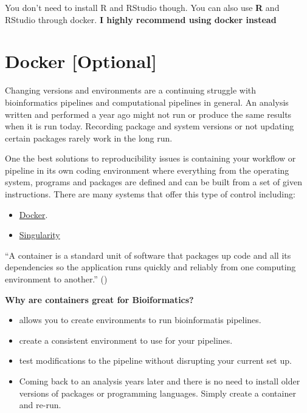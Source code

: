 \documentclass[
]{book}
\providecommand{\tightlist}{%
  \setlength{\itemsep}{0pt}\setlength{\parskip}{0pt}}
\begin{document}
You don't need to install R and RStudio though. You can also use \textbf{R} and RStudio through docker. \textbf{I highly recommend using docker instead}

\section{Docker {[}Optional{]}}\label{docker-optional}

Changing versions and environments are a continuing struggle with bioinformatics pipelines and computational pipelines in general. An analysis written and performed a year ago might not run or produce the same results when it is run today. Recording package and system versions or not updating certain packages rarely work in the long run.

One the best solutions to reproducibility issues is containing your workflow or pipeline in its own coding environment where everything from the operating system, programs and packages are defined and can be built from a set of given instructions. There are many systems that offer this type of control including:

\begin{itemize}
\tightlist
\item
  \href{https://www.docker.com/}{Docker}.
\item
  \href{https://sylabs.io/}{Singularity}
\end{itemize}

``A container is a standard unit of software that packages up code and all its dependencies so the application runs quickly and reliably from one computing environment to another.'' ()

\textbf{Why are containers great for Bioiformatics?}

\begin{itemize}
\tightlist
\item
  allows you to create environments to run bioinformatis pipelines.
\item
  create a consistent environment to use for your pipelines.
\item
  test modifications to the pipeline without disrupting your current set up.
\item
  Coming back to an analysis years later and there is no need to install older versions of packages or programming languages. Simply create a container and re-run.
\end{itemize}
\end{document}
